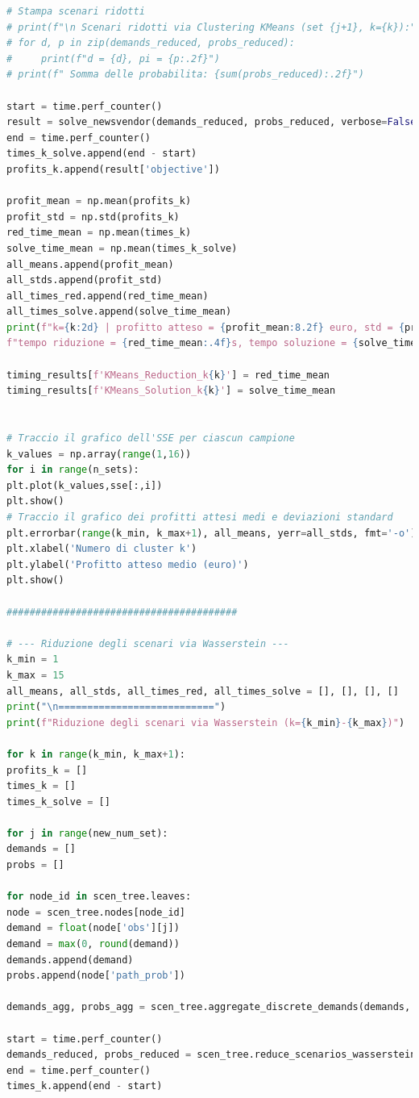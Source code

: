 \documentclass[a4paper,12pt]{article}
\begin{document}
\begin{lstlisting}[language=python,caption={Main of Newvendor problem},label={lst:main-nv}]
# Stampa scenari ridotti 
# print(f"\n Scenari ridotti via Clustering KMeans (set {j+1}, k={k}):")
# for d, p in zip(demands_reduced, probs_reduced):
#     print(f"d = {d}, pi = {p:.2f}")
# print(f" Somma delle probabilita: {sum(probs_reduced):.2f}")

start = time.perf_counter()
result = solve_newsvendor(demands_reduced, probs_reduced, verbose=False)
end = time.perf_counter()
times_k_solve.append(end - start)
profits_k.append(result['objective'])

profit_mean = np.mean(profits_k)
profit_std = np.std(profits_k)    
red_time_mean = np.mean(times_k)
solve_time_mean = np.mean(times_k_solve)
all_means.append(profit_mean)
all_stds.append(profit_std)
all_times_red.append(red_time_mean)
all_times_solve.append(solve_time_mean)
print(f"k={k:2d} | profitto atteso = {profit_mean:8.2f} euro, std = {profit_std:6.2f} euro, "
f"tempo riduzione = {red_time_mean:.4f}s, tempo soluzione = {solve_time_mean:.4f}s")

timing_results[f'KMeans_Reduction_k{k}'] = red_time_mean
timing_results[f'KMeans_Solution_k{k}'] = solve_time_mean


# Traccio il grafico dell'SSE per ciascun campione
k_values = np.array(range(1,16))
for i in range(n_sets):
plt.plot(k_values,sse[:,i])
plt.show()
# Traccio il grafico dei profitti attesi medi e deviazioni standard
plt.errorbar(range(k_min, k_max+1), all_means, yerr=all_stds, fmt='-o')
plt.xlabel('Numero di cluster k')
plt.ylabel('Profitto atteso medio (euro)')
plt.show()

########################################

# --- Riduzione degli scenari via Wasserstein ---
k_min = 1
k_max = 15
all_means, all_stds, all_times_red, all_times_solve = [], [], [], []
print("\n===========================")
print(f"Riduzione degli scenari via Wasserstein (k={k_min}-{k_max})")

for k in range(k_min, k_max+1):
profits_k = []
times_k = []
times_k_solve = []

for j in range(new_num_set):
demands = []
probs = []

for node_id in scen_tree.leaves:
node = scen_tree.nodes[node_id]
demand = float(node['obs'][j])
demand = max(0, round(demand))
demands.append(demand)
probs.append(node['path_prob'])

demands_agg, probs_agg = scen_tree.aggregate_discrete_demands(demands, probs)

start = time.perf_counter()
demands_reduced, probs_reduced = scen_tree.reduce_scenarios_wasserstein_1D(demands_agg, probs_agg, k=k)
end = time.perf_counter()
times_k.append(end - start)


\end{lstlisting}
\end{document}
